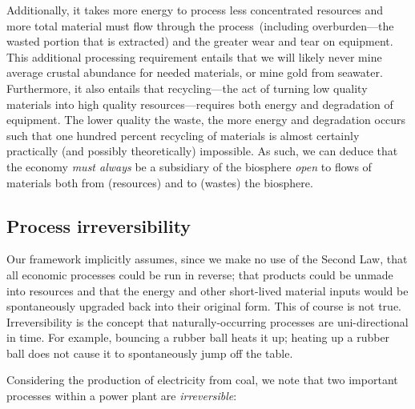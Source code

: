 Additionally,
it takes more energy to process less concentrated resources
and more total material must flow through 
the process~(including overburden---the wasted portion that is extracted)
and the greater wear and tear on equipment.
This additional processing requirement entails that 
we will likely never mine average crustal abundance for needed
materials, or mine gold from seawater.
Furthermore,
it also entails that recycling---the act
of turning low quality materials into
high quality resources---requires both energy
and degradation of equipment.
The lower quality the waste,
the more energy and degradation occurs
such that
one hundred percent recycling of materials
is almost certainly practically (and possibly theoretically) 
impossible.
As such, 
we can deduce that the economy \emph{must always} be
a subsidiary of the biosphere \emph{open} to
flows of materials both from (resources) and 
to (wastes) the biosphere.



\subsection{Process irreversibility}
\label{sec:irreversibility}
Our framework implicitly assumes, 
since we make no use of the Second Law,
that all economic processes could be run in reverse;
that products could be unmade into resources
and that the energy and other short-lived material
inputs would be spontaneously upgraded back into their
original form.
This of course is not true.
Irreversibility is the concept that naturally-occurring processes 
are uni-directional in time.
For example, 
bouncing a rubber ball heats it up;
heating up a rubber ball does not cause it to
spontaneously jump off the table.

Considering the production of electricity from coal,
we note that two important processes within a power plant are \emph{irreversible}:

